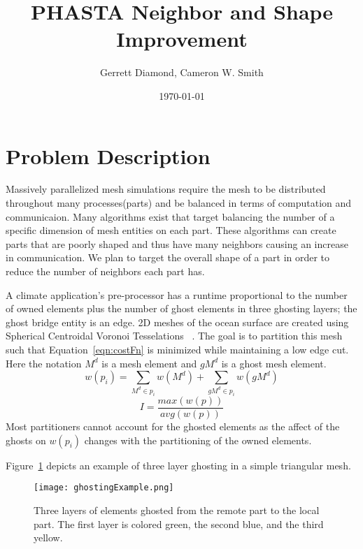 \documentclass[a4paper]{article}
\title{PHASTA Neighbor and Shape Improvement}
\author{Gerrett Diamond, Cameron W. Smith}
\date{\today}
\begin{document}
\maketitle

\section{Problem Description}

Massively parallelized mesh simulations require the mesh to be distributed throughout many processes(parts) and be balanced in terms of computation and communicaion. Many algorithms exist that target balancing the number of a specific dimension of mesh entities on each part. These algorithms can create parts that are poorly shaped and thus have many neighbors causing an increase in communication. We plan to target the overall shape of a part in order to reduce the number of neighbors each part has. 
 
A climate application's pre-processor has a runtime proportional to the number of owned elements plus the number of ghost elements in three ghosting layers; the ghost bridge entity is an edge.  2D meshes of the ocean surface are created using Spherical Centroidal Voronoi Tesselations ~\cite{JuRingler2011,ringler2008}.  The goal is to partition this mesh such that Equation~\ref{eqn:costFn} is minimized while maintaining a low edge cut.  Here the notation $M^d$ is a mesh element and $gM^d$ is a ghost mesh element.
\begin{equation}
\label{eqn:weightVoroni}
w(p_i) = \sum_{M^d \in p_i}w(M^d) + \sum_{gM^d \in p_i}w(gM^d)
\end{equation}
\begin{equation}
\label{eqn:costFn}
I = \frac{max(w(p))}{avg(w(p))}
\end{equation}
Most partitioners cannot account for the ghosted elements as the affect of the ghosts on $w(p_i)$ changes with the partitioning of the owned elements.  

Figure~\ref{fig:ghostEx} depicts an example of three layer ghosting in a simple triangular mesh.

\begin{figure} 
\centering
\texttt{[image: ghostingExample.png]}
\caption{\label{fig:ghostEx} Three layers of elements ghosted from the remote part to the local part.  The first layer is colored green, the second blue, and the third yellow.}
\end{figure}
\end{document}
